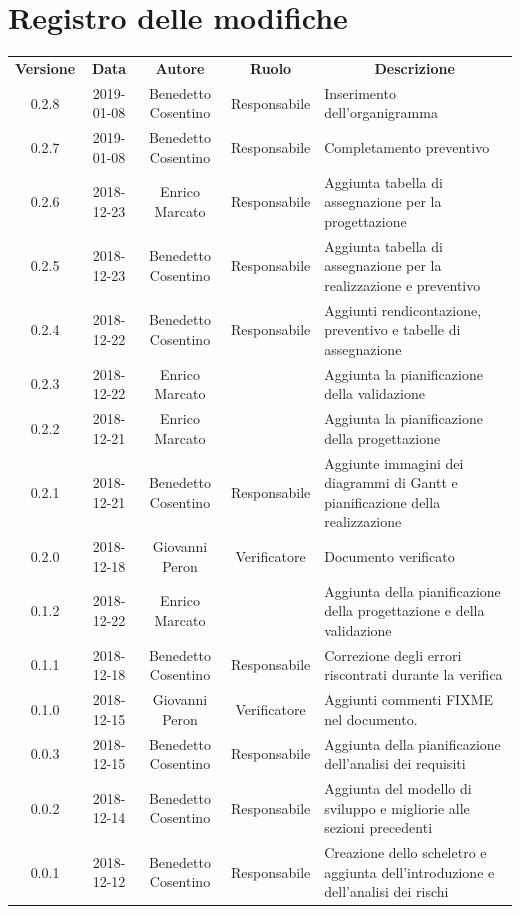 \documentclass[11pt,a4paper]{article}
\begin{document}
	
	
	\newpage
	\section*{\centering Registro delle modifiche}
	\begin{tabularx}{\textwidth}{ c | c | c | c | X }
		\rowcolor{LightBlue}
		\color{white}\bfseries Versione & 
		\color{white}\bfseries Data & 
		\color{white}\bfseries Autore & 
		\color{white}\bfseries Ruolo & 
		\multicolumn{1}{c}{\color{white}\bfseries Descrizione}\\[0.25cm]

		0.2.8 & 2019-01-08 & Benedetto Cosentino & Responsabile & Inserimento dell'organigramma \\
		0.2.7 & 2019-01-08 & Benedetto Cosentino & Responsabile & Completamento preventivo \\		
		0.2.6 & 2018-12-23 & Enrico Marcato & Responsabile & Aggiunta tabella di assegnazione per la progettazione\\
		0.2.5 & 2018-12-23 & Benedetto Cosentino & Responsabile & Aggiunta tabella di assegnazione per la realizzazione e preventivo\\
		0.2.4 & 2018-12-22 & Benedetto Cosentino & Responsabile & Aggiunti rendicontazione, preventivo e tabelle di assegnazione \\
		0.2.3 & 2018-12-22 & Enrico Marcato &  & Aggiunta la pianificazione della validazione\\
		0.2.2 & 2018-12-21 & Enrico Marcato &  & Aggiunta la pianificazione della progettazione\\
		0.2.1 & 2018-12-21 & Benedetto Cosentino & Responsabile & Aggiunte immagini dei diagrammi di Gantt e pianificazione della realizzazione\\
		0.2.0 & 2018-12-18 & Giovanni Peron & Verificatore & Documento verificato\\
		0.1.2 & 2018-12-22 & Enrico Marcato &  & Aggiunta della pianificazione della progettazione e della validazione\\
		0.1.1 & 2018-12-18 & Benedetto Cosentino & Responsabile & Correzione degli errori riscontrati durante la verifica\\
		0.1.0 & 2018-12-15 & Giovanni Peron & Verificatore & Aggiunti commenti FIXME nel documento.\\
		0.0.3 & 2018-12-15 & Benedetto Cosentino & Responsabile & Aggiunta della pianificazione dell'analisi dei requisiti\\
		0.0.2 & 2018-12-14 & Benedetto Cosentino & Responsabile & Aggiunta del modello di sviluppo e migliorie alle sezioni precedenti\\
		0.0.1 & 2018-12-12 & Benedetto Cosentino & Responsabile & Creazione dello scheletro e aggiunta dell'introduzione e dell'analisi dei rischi\\
	\end{tabularx}
	\newpage
	\tableofcontents
	\newpage	
\end{document}
